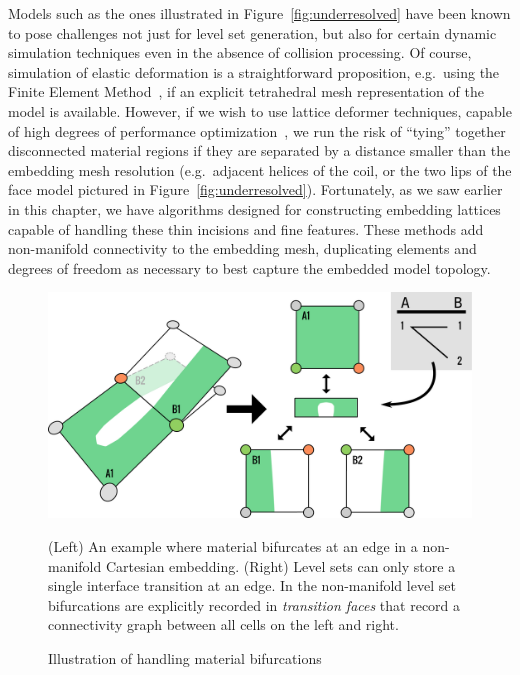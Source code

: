 Models such as the ones illustrated in Figure~\ref{fig:underresolved}
have been known to pose challenges not just for level set generation,
but also for certain dynamic simulation techniques even in the absence
of collision processing. Of course, simulation of elastic deformation
is a straightforward proposition, e.g.\ using the Finite Element
Method~\cite{SifakB:2012}, if an explicit tetrahedral mesh
representation of the model is available. However, if we wish to use
lattice deformer techniques, capable of high degrees of performance
optimization~\cite{RiverJ:2007,McAdaZSETTS:2011,MitchCS:2015}, we run
the risk of ``tying'' together disconnected material regions if they
are separated by a distance smaller than the embedding mesh resolution
(e.g.\ adjacent helices of the coil, or the two lips of the face model
pictured in Figure~\ref{fig:underresolved}). Fortunately, as we saw
earlier in this chapter, we have algorithms designed for constructing
embedding lattices capable of handling these thin incisions and fine
features. These methods add non-manifold connectivity to the embedding
mesh, duplicating elements and degrees of freedom as necessary to best
capture the embedded model topology.

\begin{figure}
  \centering
  \includegraphics[width=.8\columnwidth]{chapter_nonmanifoldlevelsets/images/TransitionFaceNew2.pdf}
\vspace*{-.1in}
  \caption{Illustration of handling material bifurcations}{(Left) An example where material bifurcates at an edge in a
    non-manifold Cartesian embedding. (Right) Level sets can only
    store a single interface transition at an edge. In the
    non-manifold level set bifurcations are explicitly recorded in
    \emph{transition faces} that record a connectivity graph between all cells on
    the left and right.}
\vspace*{-.2in}
  \label{fig:transition-face}
\end{figure}

